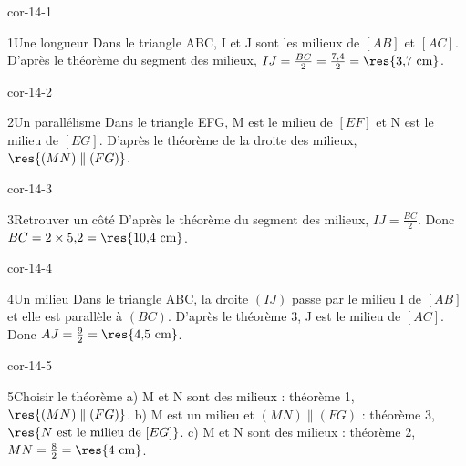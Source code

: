 \clearpage\pagestyle{otMain}\setlength{\otBlocEspacement}{2.5mm}\fontsize{11}{15}\selectfont{}
\begin{blocLivre}{cor-14-1}\begin{corrige}{1}{Une longueur}
Dans le triangle ABC, I et J sont les milieux de $[AB]$ et $[AC]$. D’après le théorème du segment des milieux, $IJ=\frac{BC}2=\frac{7{,}4}2=\res{3{,}7\ \mathrm{cm}}$.
\label{fig-cor-14-1}
\end{corrige}\end{blocLivre}
\begin{blocLivre}{cor-14-2}\begin{corrige}{2}{Un parallélisme}
Dans le triangle EFG, M est le milieu de $[EF]$ et N est le milieu de $[EG]$. D’après le théorème de la droite des milieux, $\res{(MN)\parallel(FG)}$.
\label{fig-cor-14-2}
\end{corrige}\end{blocLivre}
\begin{blocLivre}{cor-14-3}\begin{corrige}{3}{Retrouver un côté}
D’après le théorème du segment des milieux, $IJ=\frac{BC}2$. Donc $BC=2\times5{,}2=\res{10{,}4\ \mathrm{cm}}$.
\label{fig-cor-14-3}
\end{corrige}\end{blocLivre}
\begin{blocLivre}{cor-14-4}\begin{corrige}{4}{Un milieu}
Dans le triangle ABC, la droite $(IJ)$ passe par le milieu I de $[AB]$ et elle est parallèle à $(BC)$. D’après le théorème 3, J est le milieu de $[AC]$. Donc $AJ=\frac92=\res{4{,}5\ \mathrm{cm}}$.
\label{fig-cor-14-4}
\end{corrige}\end{blocLivre}
\begin{blocLivre}{cor-14-5}\begin{corrige}{5}{Choisir le théorème}
a) M et N sont des milieux : théorème 1, $\res{(MN)\parallel(FG)}$. b) M est un milieu et $(MN)\parallel(FG)$ : théorème 3, $\res{N\text{ est le milieu de }[EG]}$. c) M et N sont des milieux : théorème 2, $MN=\frac82=\res{4\ \mathrm{cm}}$.
\label{fig-cor-14-5}
\end{corrige}\end{blocLivre}
